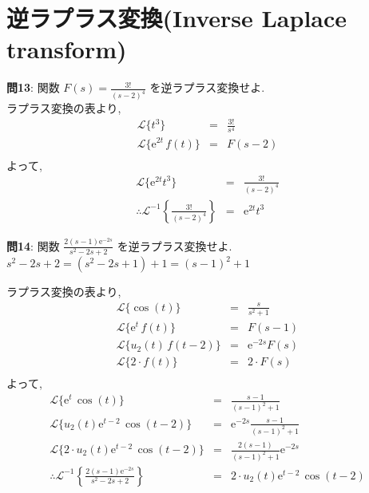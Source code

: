 ﻿\documentclass[a4j]{jarticle}
\begin{document}
\section{逆ラプラス変換(Inverse Laplace transform)}
%
\noindent
\large{\bf{問13}}: 関数 \( F(s) = \frac{3!}{(s-2)^4} \) を逆ラプラス変換せよ. \\

ラプラス変換の表より,
\begin{eqnarray*}
                  \mathcal{L} \{ t^3 \} &=& \frac{3!}{s^4} \\
\mathcal{L} \{ \mathrm{e}^{2t}\,f(t) \} &=& F(s-2) \\
\end{eqnarray*}
よって,
\begin{eqnarray*}
                  \mathcal{L} \{ \mathrm{e}^{2t}t^3 \}                 &=& \frac{3!}{(s-2)^4} \\
\therefore        \mathcal{L}^{-1} \left\{ \frac{3!}{(s-2)^4} \right\} &=& \mathrm{e}^{2t}t^3
\end{eqnarray*}

\noindent
\large{\bf{問14}}: 関数 \( \frac{2(s-1)\mathrm{e}^{-2s}}{s^2-2s+2} \) を逆ラプラス変換せよ. \\

\( s^2-2s+2 = (s^2-2s+1)+1 = (s-1)^2 + 1 \)

ラプラス変換の表より,
\begin{eqnarray*}
              \mathcal{L} \{ \cos(t) \} &=& \frac{s}{s^2 + 1} \\
 \mathcal{L} \{ \mathrm{e}^{t}\,f(t) \} &=& F(s-1) \\
       \mathcal{L} \{ u_2(t)\,f(t-2) \} &=& \mathrm{e}^{-2s}F(s) \\
       \mathcal{L} \{ 2\cdot f(t) \} &=& 2 \cdot F(s) \\
\end{eqnarray*}
よって,
\begin{eqnarray*}
                \mathcal{L} \{ \mathrm{e}^{t}\,\cos(t) \} &=& \frac{s-1}{(s-1)^2+1} \\
      \mathcal{L} \{ u_2(t)\mathrm{e}^{t-2}\,\cos(t-2) \} &=& \mathrm{e}^{-2s}\frac{s-1}{(s-1)^2+1} \\
\mathcal{L} \{ 2\cdot u_2(t)\mathrm{e}^{t-2}\,\cos(t-2) \} &=& \frac{2(s-1)}{(s-1)^2+1}\mathrm{e}^{-2s} \\
\therefore \mathcal{L}^{-1} \left\{ \frac{2(s-1)\mathrm{e}^{-2s}}{s^2-2s+2} \right\} &=& 2\cdot u_2(t)\mathrm{e}^{t-2}\,\cos(t-2)
\end{eqnarray*}
\end{document}
